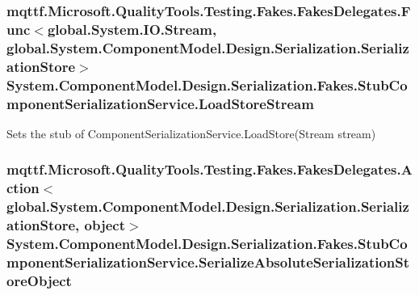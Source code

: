 \hypertarget{class_system_1_1_component_model_1_1_design_1_1_serialization_1_1_fakes_1_1_stub_component_serialization_service_a0241cde865e2ba1d4eddbac2cf5cd9fd}{
\subsubsection[{Load\-Store\-Stream}]{\setlength{\rightskip}{0pt plus 5cm}mqttf.\-Microsoft.\-Quality\-Tools.\-Testing.\-Fakes.\-Fakes\-Delegates.\-Func$<$global.\-System.\-I\-O.\-Stream, global.\-System.\-Component\-Model.\-Design.\-Serialization.\-Serialization\-Store$>$ System.\-Component\-Model.\-Design.\-Serialization.\-Fakes.\-Stub\-Component\-Serialization\-Service.\-Load\-Store\-Stream}}\label{class_system_1_1_component_model_1_1_design_1_1_serialization_1_1_fakes_1_1_stub_component_serialization_service_a0241cde865e2ba1d4eddbac2cf5cd9fd}


Sets the stub of Component\-Serialization\-Service.\-Load\-Store(\-Stream stream)

\hypertarget{class_system_1_1_component_model_1_1_design_1_1_serialization_1_1_fakes_1_1_stub_component_serialization_service_aeb9c42adc33f35979c81640eea116734}{
\subsubsection[{Serialize\-Absolute\-Serialization\-Store\-Object}]{\setlength{\rightskip}{0pt plus 5cm}mqttf.\-Microsoft.\-Quality\-Tools.\-Testing.\-Fakes.\-Fakes\-Delegates.\-Action$<$global.\-System.\-Component\-Model.\-Design.\-Serialization.\-Serialization\-Store, object$>$ System.\-Component\-Model.\-Design.\-Serialization.\-Fakes.\-Stub\-Component\-Serialization\-Service.\-Serialize\-Absolute\-Serialization\-Store\-Object}}\label{class_system_1_1_component_model_1_1_design_1_1_serialization_1_1_fakes_1_1_stub_component_serialization_service_aeb9c42adc33f35979c81640eea116734}


